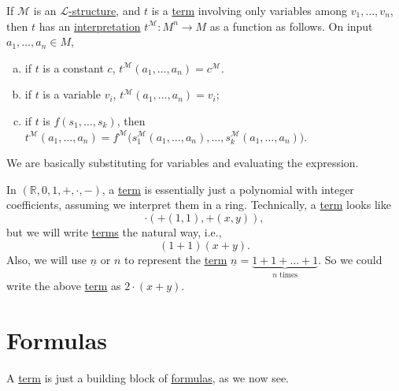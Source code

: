 If \(\mathcal{M}\) is an \hyperref[def:structure]{\(\mathcal{L} \)-structure}, and \(t\) is a \hyperref[def:term]{term} involving only variables among \(v_1, \ldots , v_n\), then \(t\) has an \hyperref[not:interpretation]{interpretation} \(t^{\mathcal{M}} \colon M^n \to M\) as a function as follows. On input \(a_1, \ldots , a_n \in M\),
\begin{enumerate}[(a)]
	\item if \(t\) is a constant \(c\), \(t^{\mathcal{M} } (a_1, \ldots , a_n) = c^{\mathcal{M} }\).
	\item if \(t\) is a variable \(v_i\), \(t^{\mathcal{M} } (a_1, \ldots , a_n) = v_i\);
	\item if \(t\) is \(f(s_1, \ldots , s_k)\), then \(t^{\mathcal{M} } (a_1, \ldots , a_n) = f^{\mathcal{M} } \big(s_1^{\mathcal{M} }(a_1, \ldots , a_n), \ldots , s_k^{\mathcal{M}}(a_1, \ldots , a_n) \big)\).
\end{enumerate}

\begin{intuition}
	We are basically substituting for variables and evaluating the expression.
\end{intuition}

\begin{eg}
	In \((\mathbb{R} , 0, 1, +, \cdot, -)\), a \hyperref[def:term]{term} is essentially just a polynomial with integer coefficients, assuming we interpret them in a ring. Technically, a \hyperref[def:term]{term} looks like
	\[
		\cdot(+(1, 1), +(x, y)),
	\]
	but we will write \hyperref[def:term]{terms} the natural way, i.e.,
	\[
		(1+1) (x+y).
	\]
	Also, we will use \(\underline{n}\) or \(n\) to represent the \hyperref[def:term]{term} \(\underline{n} = \underbrace{1+1+\ldots +1}_{n\text{ times}}\). So we could write the above \hyperref[def:term]{term} as \(2\cdot(x+y)\).
\end{eg}

\section{Formulas}
A \hyperref[def:term]{term} is just a building block of \hyperref[def:formula]{formulas}, as we now see.

